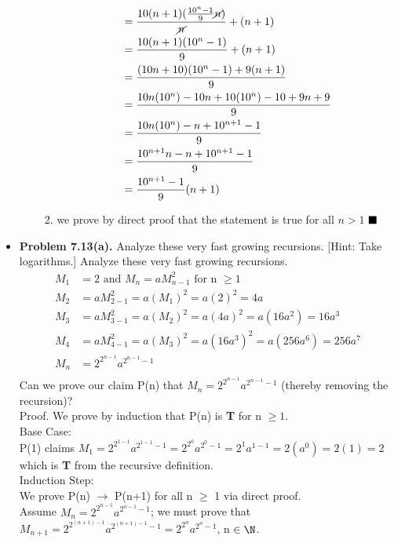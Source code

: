 \documentclass{article}
\begin{document}
\begin{itemize}
\begin{enumerate}[label=(c)]
\begin{enumerate}[label=\roman*.]
\begin{align*}
                    &= \frac{10(n+1)(\frac{10^n-1}{9}\cancel{n})}{\cancel{n}} + (n+1)\\
                    &= \frac{10(n+1)(10^n-1)}{9} + (n+1)\\
                    &= \frac{(10n+10)(10^n-1) + 9(n+1)}{9}\\
                    &= \frac{10n(10^n) - 10n + 10(10^n) - 10 + 9n + 9}{9}\\
                    &= \frac{10n(10^n) - n + 10^{n+1} - 1}{9}\\
                    &= \frac{10^{n+1}n - n + 10^{n+1} - 1}{9}\\
                    &= \frac{10^{n+1} - 1}{9}(n+1)
                \end{align*}
                \item we prove by direct proof that the statement is true for all $n > 1$ $\hfill \blacksquare$
            \end{enumerate}
        \end{enumerate}
        \item \textbf{Problem 7.13(a).} Analyze these very fast growing recursions. [Hint: Take logarithms.]
       Analyze these very fast growing recursions.
	\begin{align*}
	M_1 &= 2 \text{ and } M_n = aM_{n-1}^2 \text{ for n $\ge 1$}\\
	M_2 &=  aM_{2-1}^2 = a(M_1)^2 = a(2)^2 = 4a\\ 
	M_3 &= aM_{3-1}^2 = a(M_2)^2 = a(4a)^2 = a(16a^2) = 16a^3\\
	M_4 &= aM_{4-1}^2 = a(M_3)^2 = a(16a^3)^2 = a(256a^6) = 256a^7\\
	M_n &= 2^{2^{n-1}}a^{2^{n-1}-1}\\
	\end{align*}
	Can we prove our claim P(n) that $M_n = 2^{2^{n-1}}a^{2^{n-1}-1}$ (thereby removing the recursion)?\\
	Proof. We prove by induction that P(n) is \textbf{T} for n $\ge 1$.\\
	Base Case:\\
	P(1) claims $M_1 = 2^{2^{1-1}}a^{2^{1-1}-1} = 2^{2^{0}}a^{2^{0} - 1} = 2^{1}a^{1 -1} = 2(a^0) = 2(1) = 2$ which is \textbf{T} from the recursive definition.\\
	Induction Step: \\ 
	We prove P(n) $\rightarrow$ P(n+1) for all n $\ge$ 1 via direct proof.\\
	Assume $M_n = 2^{2^{n-1}}a^{2^{n-1}-1}$; we must prove that $M_{n+1} = 2^{2^{(n+1)-1}}a^{2^{(n+1)-1}-1} = 2^{2^n}a^{2^{n}-1}$, n $\in \N$.\\

\end{itemize}
\end{document}
